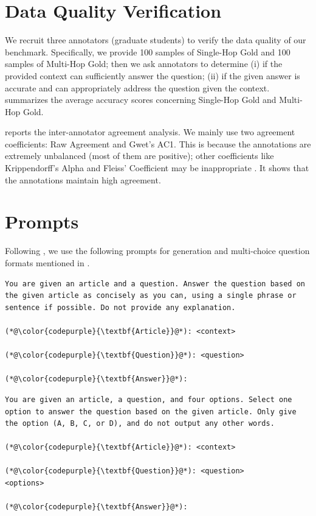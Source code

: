 

\section{Data Quality Verification} \label{app_data_verification}
    We recruit three annotators (graduate students) to verify the data quality of our benchmark.
    Specifically, we provide 100 samples of Single-Hop Gold and 100 samples of Multi-Hop Gold;
    then we ask annotators to determine
    (i) if the provided context can sufficiently answer the question;
    (ii) if the given answer is accurate and can appropriately address the question given the context.
     summarizes the average accuracy scores concerning Single-Hop Gold and Multi-Hop Gold.

     reports the inter-annotator agreement analysis.
    We mainly use two agreement coefficients: Raw Agreement and Gwet's AC1.
    This is because the annotations are extremely unbalanced (most of them are positive); other coefficients like Krippendorff’s Alpha and Fleiss’ Coefficient may be inappropriate \cite{gwet2008computing}.
    It shows that the annotations maintain high agreement.

\clearpage
\section{Prompts} \label{app_prompt}

    Following \citet{bai2024longbench},
    we use the following prompts for generation and multi-choice question formats mentioned in .

\lstset{
    style=prompt_style,
}
\begin{lstlisting}
You are given an article and a question. Answer the question based on the given article as concisely as you can, using a single phrase or sentence if possible. Do not provide any explanation.

(*@\color{codepurple}{\textbf{Article}}@*): <context>

(*@\color{codepurple}{\textbf{Question}}@*): <question>

(*@\color{codepurple}{\textbf{Answer}}@*):
\end{lstlisting}

\lstset{
    style=prompt_style,
}
\begin{lstlisting}
You are given an article, a question, and four options. Select one option to answer the question based on the given article. Only give the option (A, B, C, or D), and do not output any other words.

(*@\color{codepurple}{\textbf{Article}}@*): <context>

(*@\color{codepurple}{\textbf{Question}}@*): <question>
<options>

(*@\color{codepurple}{\textbf{Answer}}@*):
\end{lstlisting}



